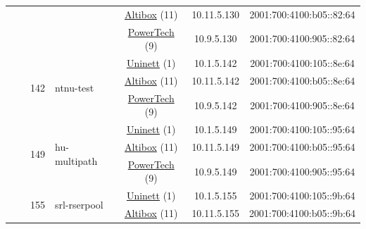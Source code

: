 \begin{small}
\begin{center}
\begin{longtable}{|c|c|c|c|c|c|c|c|}
  &  &  &  & \multicolumn{2}{|c|}{\tiny{\href{https://www.altibox.no}{Altibox} (11)}} & \tiny{10.11.5.130} & \tiny{2001:700:4100:b05::82:64} \\* \cline{5-5}\cline{6-6}\cline{7-7}\cline{8-8}
  &  &  &  & \multicolumn{2}{|c|}{\tiny{\href{http://www.powertech.no}{PowerTech} (9)}} & \tiny{10.9.5.130} & \tiny{2001:700:4100:905::82:64} \\* \cline{3-3}\cline{4-4}\cline{5-5}\cline{6-6}\cline{7-7}\cline{8-8}
  &  & \multirow{3}{*}{\tiny{142}} & \multicolumn{1}{|l|}{\multirow{3}{*}{\tiny{ntnu-test}}} & \multicolumn{2}{|c|}{\tiny{\href{https://www.uninett.no}{Uninett} (1)}} & \tiny{10.1.5.142} & \tiny{2001:700:4100:105::8e:64} \\* \cline{5-5}\cline{6-6}\cline{7-7}\cline{8-8}
  &  &  &  & \multicolumn{2}{|c|}{\tiny{\href{https://www.altibox.no}{Altibox} (11)}} & \tiny{10.11.5.142} & \tiny{2001:700:4100:b05::8e:64} \\* \cline{5-5}\cline{6-6}\cline{7-7}\cline{8-8}
  &  &  &  & \multicolumn{2}{|c|}{\tiny{\href{http://www.powertech.no}{PowerTech} (9)}} & \tiny{10.9.5.142} & \tiny{2001:700:4100:905::8e:64} \\* \cline{3-3}\cline{4-4}\cline{5-5}\cline{6-6}\cline{7-7}\cline{8-8}
  &  & \multirow{3}{*}{\tiny{149}} & \multicolumn{1}{|l|}{\multirow{3}{*}{\tiny{hu-multipath}}} & \multicolumn{2}{|c|}{\tiny{\href{https://www.uninett.no}{Uninett} (1)}} & \tiny{10.1.5.149} & \tiny{2001:700:4100:105::95:64} \\* \cline{5-5}\cline{6-6}\cline{7-7}\cline{8-8}
  &  &  &  & \multicolumn{2}{|c|}{\tiny{\href{https://www.altibox.no}{Altibox} (11)}} & \tiny{10.11.5.149} & \tiny{2001:700:4100:b05::95:64} \\* \cline{5-5}\cline{6-6}\cline{7-7}\cline{8-8}
  &  &  &  & \multicolumn{2}{|c|}{\tiny{\href{http://www.powertech.no}{PowerTech} (9)}} & \tiny{10.9.5.149} & \tiny{2001:700:4100:905::95:64} \\* \cline{3-3}\cline{4-4}\cline{5-5}\cline{6-6}\cline{7-7}\cline{8-8}
  &  & \multirow{3}{*}{\tiny{155}} & \multicolumn{1}{|l|}{\multirow{3}{*}{\tiny{srl-rserpool}}} & \multicolumn{2}{|c|}{\tiny{\href{https://www.uninett.no}{Uninett} (1)}} & \tiny{10.1.5.155} & \tiny{2001:700:4100:105::9b:64} \\* \cline{5-5}\cline{6-6}\cline{7-7}\cline{8-8}
  &  &  &  & \multicolumn{2}{|c|}{\tiny{\href{https://www.altibox.no}{Altibox} (11)}} & \tiny{10.11.5.155} & \tiny{2001:700:4100:b05::9b:64} \\* \cline{5-5}\cline{6-6}\cline{7-7}\cline{8-8}

\end{longtable}
\end{center}
\end{small}
